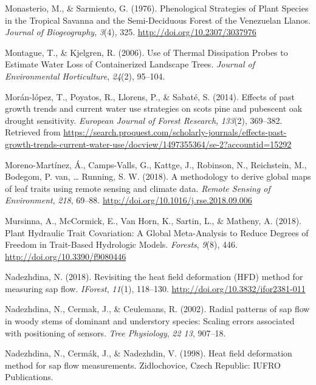 \documentclass[11pt,twoside]{reedthesis}
\begin{document}
\hypertarget{ref-monasterio_phenological_1976}{}
Monasterio, M., \& Sarmiento, G. (1976). Phenological Strategies of
Plant Species in the Tropical Savanna and the Semi-Deciduous Forest of
the Venezuelan Llanos. \emph{Journal of Biogeography}, \emph{3}(4), 325.
\url{http://doi.org/10.2307/3037976}

\hypertarget{ref-Montague2006}{}
Montague, T., \& Kjelgren, R. (2006). Use of Thermal Dissipation Probes
to Estimate Water Loss of Containerized Landscape Trees. \emph{Journal
of Environmental Horticulture}, \emph{24}(2), 95--104.

\hypertarget{ref-moranlopez2014}{}
Morán-lópez, T., Poyatos, R., Llorens, P., \& Sabaté, S. (2014). Effects
of past growth trends and current water use strategies on scots pine and
pubescent oak drought sensitivity. \emph{European Journal of Forest
Research}, \emph{133}(2), 369--382. Retrieved from
\url{https://search.proquest.com/scholarly-journals/effects-past-growth-trends-current-water-use/docview/1497355364/se-2?accountid=15292}

\hypertarget{ref-moreno-martinez_methodology_2018}{}
Moreno-Martínez, Á., Camps-Valls, G., Kattge, J., Robinson, N.,
Reichstein, M., Bodegom, P. van, \ldots{} Running, S. W. (2018). A
methodology to derive global maps of leaf traits using remote sensing
and climate data. \emph{Remote Sensing of Environment}, \emph{218},
69--88. \url{http://doi.org/10.1016/j.rse.2018.09.006}

\hypertarget{ref-mursinna_plant_2018}{}
Mursinna, A., McCormick, E., Van Horn, K., Sartin, L., \& Matheny, A.
(2018). Plant Hydraulic Trait Covariation: A Global Meta-Analysis to
Reduce Degrees of Freedom in Trait-Based Hydrologic Models.
\emph{Forests}, \emph{9}(8), 446. \url{http://doi.org/10.3390/f9080446}

\hypertarget{ref-Nadezhdina2018}{}
Nadezhdina, N. (2018). Revisiting the heat field deformation (HFD)
method for measuring sap flow. \emph{IForest}, \emph{11}(1), 118--130.
\url{http://doi.org/10.3832/ifor2381-011}

\hypertarget{ref-Nadezhdina2002}{}
Nadezhdina, N., Cermak, J., \& Ceulemans, R. (2002). Radial patterns of
sap flow in woody stems of dominant and understory species: Scaling
errors associated with positioning of sensors. \emph{Tree Physiology},
\emph{22 13}, 907--18.

\hypertarget{ref-Nadezhdina1998}{}
Nadezhdina, N., Cermák, J., \& Nadezhdin, V. (1998). Heat field
deformation method for sap flow measurements. Zidlochovice, Czech
Republic: IUFRO Publications.
\end{document}
